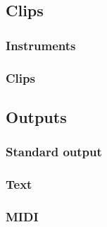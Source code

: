 \documentclass[11pt,twoside]{article}
\begin{document}
\subsection{Clips}

\subsubsection{Instruments}


\subsubsection{Clips}

\subsection{Outputs}

\subsubsection{Standard output}

\subsubsection{Text}

\subsubsection{MIDI}
\end{document}
